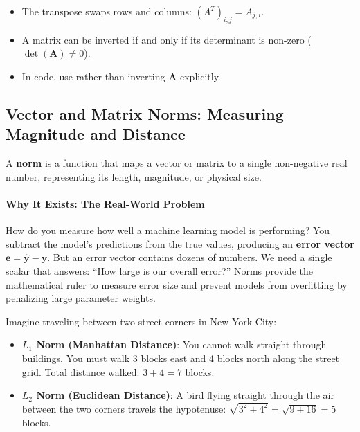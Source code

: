 \begin{takeaways}
\begin{itemize}
    \item The transpose swaps rows and columns: $(A^T)_{i,j} = A_{j,i}$.
    \item A matrix can be inverted if and only if its determinant is non-zero ($\det(\mathbf{A}) \ne 0$).
    \item In code, use  rather than inverting $\mathbf{A}$ explicitly.
\end{itemize}
\end{takeaways}

\subsection{Vector and Matrix Norms: Measuring Magnitude and Distance}

\begin{keyidea}
A \textbf{norm} is a function that maps a vector or matrix to a single non-negative real number, representing its length, magnitude, or physical size.
\end{keyidea}

\paragraph{Why It Exists: The Real-World Problem}
How do you measure how well a machine learning model is performing? You subtract the model's predictions from the true values, producing an \textbf{error vector} $\mathbf{e} = \hat{\mathbf{y}} - \mathbf{y}$. But an error vector contains dozens of numbers. We need a single scalar that answers: ``How large is our overall error?'' Norms provide the mathematical ruler to measure error size and prevent models from overfitting by penalizing large parameter weights.

\begin{analogy}
Imagine traveling between two street corners in New York City:
\begin{itemize}
    \item \textbf{$L_1$ Norm (Manhattan Distance)}: You cannot walk straight through buildings. You must walk 3 blocks east and 4 blocks north along the street grid. Total distance walked: $3 + 4 = 7$ blocks.
    \item \textbf{$L_2$ Norm (Euclidean Distance)}: A bird flying straight through the air between the two corners travels the hypotenuse: $\sqrt{3^2 + 4^2} = \sqrt{9 + 16} = 5$ blocks.
\end{itemize}
\end{analogy}

